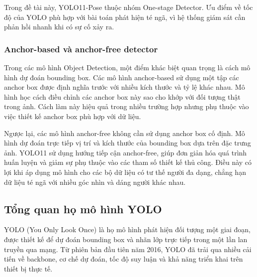 \documentclass[12pt, a4paper]{article}
\begin{document}
Trong đề tài này, YOLO11-Pose thuộc nhóm One-stage Detector.
Ưu điểm về tốc độ của YOLO phù hợp với bài toán phát hiện té ngã, vì hệ thống giám sát cần phản hồi nhanh khi có sự cố xảy ra.

\subsubsection{Anchor-based và anchor-free detector}
Trong các mô hình Object Detection, một điểm khác biệt quan trọng là cách mô hình dự đoán bounding box.
Các mô hình anchor-based sử dụng một tập các anchor box được định nghĩa trước với nhiều kích thước và tỷ lệ khác nhau.
Mô hình học cách điều chỉnh các anchor box này sao cho khớp với đối tượng thật trong ảnh.
Cách làm này hiệu quả trong nhiều trường hợp nhưng phụ thuộc vào việc thiết kế anchor box phù hợp với dữ liệu.

Ngược lại, các mô hình anchor-free không cần sử dụng anchor box cố định.
Mô hình dự đoán trực tiếp vị trí và kích thước của bounding box dựa trên đặc trưng ảnh.
YOLO11 sử dụng hướng tiếp cận anchor-free, giúp đơn giản hóa quá trình huấn luyện và giảm sự phụ thuộc vào các tham số thiết kế thủ công.
Điều này có lợi khi áp dụng mô hình cho các bộ dữ liệu có tư thế người đa dạng, chẳng hạn dữ liệu té ngã với nhiều góc nhìn và dáng người khác nhau.

\subsection{Tổng quan họ mô hình YOLO}

YOLO (You Only Look Once) là họ mô hình phát hiện đối tượng một giai đoạn, được thiết kế để dự đoán bounding box và nhãn lớp trực tiếp trong một lần lan truyền qua mạng.
Từ phiên bản đầu tiên năm 2016, YOLO đã trải qua nhiều cải tiến về backbone, cơ chế dự đoán, tốc độ suy luận và khả năng triển khai trên thiết bị thực tế.
\end{document}
